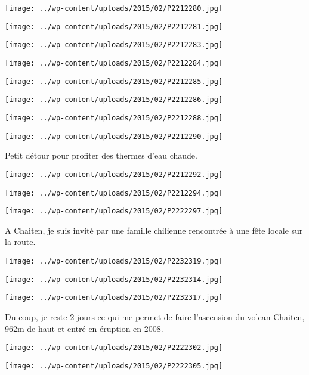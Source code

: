 \centerline{\texttt{[image: ../wp-content/uploads/2015/02/P2212280.jpg]} } 
 \newline
\centerline{\texttt{[image: ../wp-content/uploads/2015/02/P2212281.jpg]} } 
 \newline
\centerline{\texttt{[image: ../wp-content/uploads/2015/02/P2212283.jpg]} } 
 \newline
\centerline{\texttt{[image: ../wp-content/uploads/2015/02/P2212284.jpg]} } 
 \newline
\centerline{\texttt{[image: ../wp-content/uploads/2015/02/P2212285.jpg]} } 
 \newline
\centerline{\texttt{[image: ../wp-content/uploads/2015/02/P2212286.jpg]} } 
 \newline
\centerline{\texttt{[image: ../wp-content/uploads/2015/02/P2212288.jpg]} } 
 \newline
\centerline{\texttt{[image: ../wp-content/uploads/2015/02/P2212290.jpg]} } 
Petit détour pour profiter des thermes d'eau chaude. \newline
 \newline
\centerline{\texttt{[image: ../wp-content/uploads/2015/02/P2212292.jpg]} } 
\newline
\centerline{\texttt{[image: ../wp-content/uploads/2015/02/P2212294.jpg]} } 
 \newline
\centerline{\texttt{[image: ../wp-content/uploads/2015/02/P2222297.jpg]} } 
A Chaiten, je suis invité par une famille chilienne rencontrée à une fête locale sur la route. \newline
 \newline
\centerline{\texttt{[image: ../wp-content/uploads/2015/02/P2232319.jpg]} } 
 \newline
\centerline{\texttt{[image: ../wp-content/uploads/2015/02/P2232314.jpg]} } 
 \newline
\centerline{\texttt{[image: ../wp-content/uploads/2015/02/P2232317.jpg]} } 
Du coup, je reste 2 jours ce qui me permet de faire l'ascension du volcan Chaiten, 962m de haut et entré en éruption en 2008. \newline
 \newline
\centerline{\texttt{[image: ../wp-content/uploads/2015/02/P2222302.jpg]} } 
  \newline
  \newline
\centerline{\texttt{[image: ../wp-content/uploads/2015/02/P2222305.jpg]} } 
